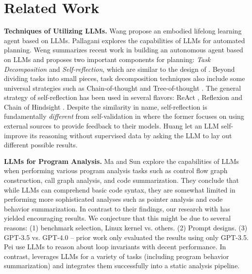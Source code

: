 \section{Related Work}

\textbf{Techniques of Utilizing LLMs.}
Wang \etal \cite{wang_voyager_2023} propose an embodied lifelong learning agent based on LLMs.
Pallagani \etal \cite{pallagani_understanding_2023} explores the capabilities of LLMs for automated planning.
 Weng \cite{weng2023prompt}  summarizes recent work in building
an autonomous agent based on LLMs and proposes two important components for planning: \textit{Task Decomposition} and \textit{Self-reflection}, which
are similar to the design of \work.
Beyond dividing tasks into small pieces, task decomposition techniques also include some universal strategies such as
Chain-of-thought \cite{wei_chain--thought_2023} and Tree-of-thought \cite{yao_tree_2023}.
The general strategy of self-reflection has been used in several flavors: ReAct \cite{yao2023react}, Reflexion \cite{shinn_reflexion_2023} and Chain of Hindsight \cite{liu_chain_2023}.
Despite the similarity in name, self-reflection is fundamentally \textit{different} from self-validation in \work where the former focuses on using external sources to provide feedback to their models. Huang \etal \cite{huang_large_2022} let an LLM self-improve its reasoning without supervised data by asking the LLM to lay out different possible results.




\vspace{3pt}
\noindent
\textbf{LLMs for Program Analysis.} %
Ma \etal \cite{ma_scope_2023} and Sun \etal \cite{sun_automatic_2023}  explore the capabilities of LLMs when performing various program analysis tasks such as control flow graph construction, call graph analysis, and code summarization. They conclude that while LLMs can comprehend basic code syntax, they are somewhat limited in performing more sophisticated analyses such as pointer analysis and code behavior summarization.
In contrast to their findings, our research with \work has yielded encouraging results. We conjecture that this might be due to several reasons: (1) benchmark selection, \ie Linux kernel vs. others.
(2) Prompt designs. (3) GPT-3.5 vs. GPT-4.0 -- prior work only evaluated the results using only GPT-3.5.
Pei \etal \cite{pei_can_2023} use LLMs to reason about loop invariants with decent performance. In contrast, \work leverages LLMs for a variety of tasks (including program behavior summarization) and integrates them successfully into a static analysis pipeline.


